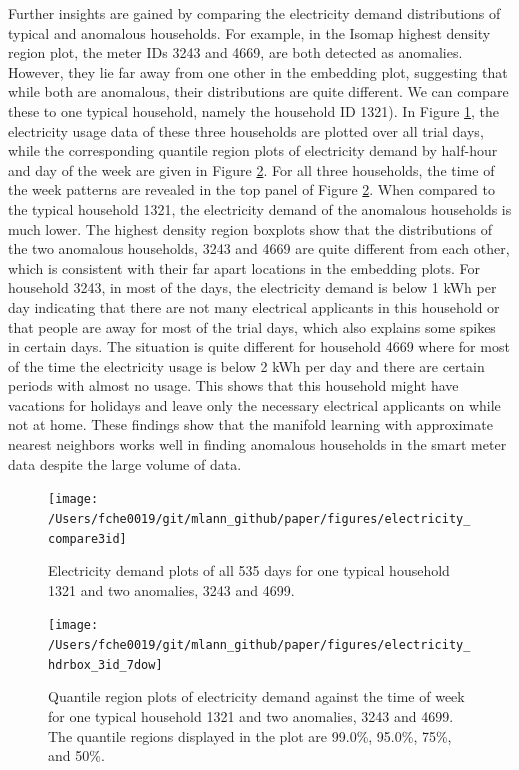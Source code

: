 \documentclass[12pt]{article}
\begin{document}
Further insights are gained by comparing the electricity demand distributions of typical and anomalous households. For example, in the Isomap highest density region plot, the meter IDs 3243 and 4669, are both detected as anomalies. However, they lie far away from one other in the embedding plot, suggesting that while both are anomalous, their distributions are quite different. We can compare these to one typical household, namely the household ID 1321). In Figure \ref{fig:compare3ids}, the electricity usage data of these three households are plotted over all trial days, while the corresponding quantile region plots of electricity demand by half-hour and day of the week are given in Figure \ref{fig:hdrboxplot3ids}. For all three households, the time of the week patterns are revealed in the top panel of Figure \ref{fig:hdrboxplot3ids}. When compared to the typical household 1321, the electricity demand of the anomalous households is much lower. The highest density region boxplots show that the distributions of the two anomalous households, 3243 and 4669 are quite different from each other, which is consistent with their far apart locations in the embedding plots. For household 3243, in most of the days, the electricity demand is below 1 kWh per day indicating that there are not many electrical applicants in this household or that people are away for most of the trial days, which also explains some spikes in certain days. The situation is quite different for household 4669 where for most of the time the electricity usage is below 2 kWh per day and there are certain periods with almost no usage. This shows that this household might have vacations for holidays and leave only the necessary electrical applicants on while not at home. These findings show that the manifold learning with approximate nearest neighbors works well in finding anomalous households in the smart meter data despite the large volume of data.

\begin{figure}

{\centering \texttt{[image: /Users/fche0019/git/mlann\_github/paper/figures/electricity\_compare3id]} 

}

\caption{Electricity demand plots of all 535 days for one typical household 1321 and two anomalies, 3243 and 4699. }\label{fig:compare3ids}
\end{figure}
\begin{figure}

{\centering \texttt{[image: /Users/fche0019/git/mlann\_github/paper/figures/electricity\_hdrbox\_3id\_7dow]} 

}

\caption{Quantile region plots of electricity demand against the time of week for one typical household 1321 and two anomalies, 3243 and 4699. The quantile regions displayed in the plot are 99.0\%, 95.0\%, 75\%, and 50\%. }\label{fig:hdrboxplot3ids}
\end{figure}
\end{document}
